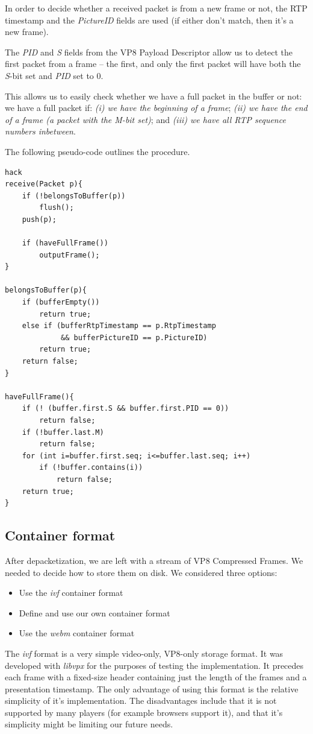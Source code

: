 \documentclass[twoside,openright,a4paper,12pt,english]{article}
\begin{document}
In order to decide whether a received packet is from a new frame or not, the
RTP timestamp and the \emph{PictureID} fields are used (if either don't match,
then it's a new frame). 

The \emph{PID} and \emph{S} fields from the VP8 Payload Descriptor allow us to
detect the first packet from a frame -- the first, and only the first packet
will have both the \emph{S}-bit set and \emph{PID} set to 0.

This allows us to easily check whether we have a full packet
in the buffer or not: we have a full packet if: \emph{(i) we have the beginning
of a frame}; \emph{(ii) we have the end of a frame (a packet with the M-bit
set)}; and \emph{(iii) we have
all RTP sequence numbers inbetween}.

The following pseudo-code outlines the procedure.

\begin{lstlisting}[frame=single]  % Start your code-block
hack
receive(Packet p){
    if (!belongsToBuffer(p))
        flush();
    push(p);

    if (haveFullFrame())
        outputFrame();
}

belongsToBuffer(p){
    if (bufferEmpty())
        return true;
    else if (bufferRtpTimestamp == p.RtpTimestamp 
             && bufferPictureID == p.PictureID)
        return true;
    return false;
}

haveFullFrame(){
    if (! (buffer.first.S && buffer.first.PID == 0))
        return false;
    if (!buffer.last.M)
        return false;
    for (int i=buffer.first.seq; i<=buffer.last.seq; i++)
        if (!buffer.contains(i))
            return false;
    return true;
}
\end{lstlisting}


\subsection{Container format}
After depacketization, we are left with a stream of VP8 Compressed Frames. We needed to decide how to store them on disk. We considered three options:
\begin{itemize}
\item Use the \emph{ivf} container format
\item Define and use our own container format
\item Use the \emph{webm} container format
\end{itemize}

The \emph{ivf} format is a very simple video-only, VP8-only storage format. It
was developed with \emph{libvpx} for the purposes of testing the
implementation. It precedes each frame with a fixed-size header containing just
the length of the frames and a presentation timestamp. The only advantage of
using this format is the relative simplicity of it's implementation. The disadvantages
include that it is not supported by many players (for example browsers support it), and
that it's simplicity might be limiting our future needs.
\end{document}
